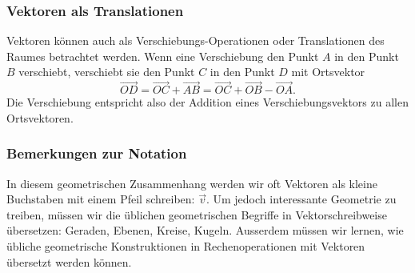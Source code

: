 \subsubsection{Vektoren als Translationen}
Vektoren können auch als Verschiebungs-Operationen  oder Translationen
des Raumes betrachtet werden.
Wenn eine Verschiebung den Punkt $A$ in den Punkt $B$ verschiebt,
verschiebt sie den Punkt $C$ in den Punkt $D$ mit Ortsvektor
\[
\overrightarrow{OD}
=
\overrightarrow{OC}+\overrightarrow{AB}
=
\overrightarrow{OC}+\overrightarrow{OB}-\overrightarrow{OA}.
\]
Die Verschiebung entspricht also der Addition eines Verschiebungsvektors
zu allen Ortsvektoren.

\subsubsection{Bemerkungen zur Notation}
In diesem geometrischen Zusammenhang werden wir oft Vektoren als
kleine Buchstaben mit einem Pfeil schreiben: $\vec v$.
Um jedoch interessante
Geometrie zu treiben, müssen wir die üblichen geometrischen Begriffe in
Vektorschreibweise übersetzen: Geraden, Ebenen, Kreise, Kugeln.
Ausserdem müssen wir lernen, wie übliche geometrische Konstruktionen in
Rechenoperationen mit Vektoren übersetzt werden können.


